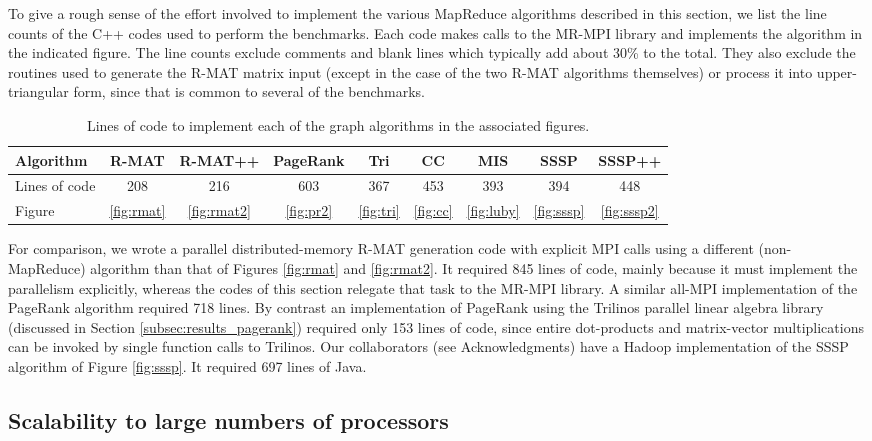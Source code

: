 To give a rough sense of the effort involved to implement the various
MapReduce algorithms described in this section, we list the line
counts of the C++ codes used to perform the benchmarks.  Each code
makes calls to the MR-MPI library and implements the algorithm in the
indicated figure.  The line counts exclude comments and blank lines
which typically add about 30\% to the total.  They also exclude the
routines used to generate the R-MAT matrix input (except in the case
of the two R-MAT algorithms themselves) or process it into
upper-triangular form, since that is common to several of the
benchmarks.

\begin{table}
\begin{center}
\begin{tabular}{|l|c|c|c|c|c|c|c|c|}
\hline
Algorithm & R-MAT & R-MAT++ & PageRank & Tri & CC & MIS & SSSP & SSSP++ \\
\hline
Lines of code & 208 & 216 & 603 & 367 & 453 & 393 & 394 & 448 \\
Figure & \ref{fig:rmat} & \ref{fig:rmat2} & \ref{fig:pr2} & \ref{fig:tri} & \ref{fig:cc} & \ref{fig:luby} & \ref{fig:sssp} & \ref{fig:sssp2} \\
\hline
\end{tabular}
\caption{Lines of code to implement each of the graph
  algorithms in the associated figures.}
\label{t:rmat}
\end{center}
\end{table}

For comparison, we wrote a parallel distributed-memory R-MAT
generation code with explicit MPI calls using a different
(non-MapReduce) algorithm than that of Figures \ref{fig:rmat} and
\ref{fig:rmat2}.  It required 845 lines of code, mainly because it
must implement the parallelism explicitly, whereas the codes of this
section relegate that task to the MR-MPI library.  A similar all-MPI
implementation of the PageRank algorithm required 718 lines.  By
contrast an implementation of PageRank using the Trilinos parallel
linear algebra library (discussed in Section
\ref{subsec:results_pagerank}) required only 153 lines of code, since
entire dot-products and matrix-vector multiplications can be invoked by single function calls to
Trilinos.  Our collaborators (see Acknowledgments) have a Hadoop
implementation of the SSSP algorithm of Figure \ref{fig:sssp}.  It
required 697 lines of Java.

\subsection{Scalability to large numbers of processors}

